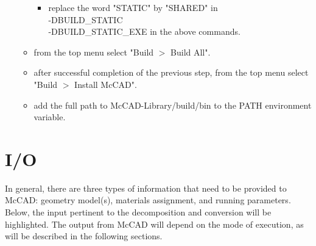\documentclass[12pt, a4paper, titlepage]{article}
\begin{document}
\begin{itemize}
\begin{itemize}
\begin{itemize}
			\item replace the word "STATIC" by "SHARED" in \\-DBUILD\_STATIC \\-DBUILD\_STATIC\_EXE in the above commands.
		\end{itemize}
		\item from the top menu select "Build $>$ Build All".
		\item after successful completion of the previous step, from the top menu select "Build $>$ Install McCAD".
		\item add the full path to McCAD-Library/build/bin to the PATH environment variable. 
	  \end{itemize}
    \end{itemize}

\section{I/O} \label{sec:I/O}
In general, there are three types of information that need to be provided to McCAD: geometry model(s), materials assignment, and running parameters. Below, the input pertinent to the decomposition and conversion will be highlighted. The output from McCAD will depend on the mode of execution, as will be described in the following sections.
\end{document}
